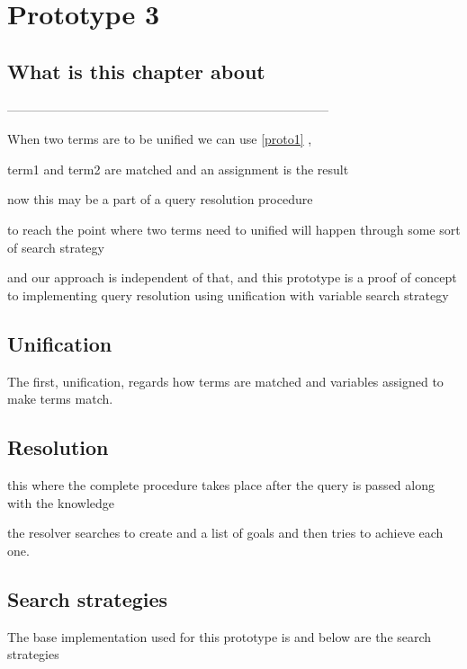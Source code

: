 \documentclass[thesis-solanki.tex]{files}
\begin{document}
\chapter{Prototype 3}{\label{proto3}}


\section{What is this chapter about}

-----------------------------------------------------------------------------

When two terms are to be unified we can use \ref{proto1} ,

term1 and term2 are matched and an assignment is the result 

now this may be a part of a query resolution procedure

to reach the point where two terms need to unified will happen through some sort of search strategy

and our approach is independent of that, and this prototype is a proof of concept to implementing query resolution using unification with
variable search strategy


\section{Unification}
The first, unification, regards how terms are matched and variables assigned to make terms match. \cite{website:prologunification}



\section{Resolution}
this where the complete procedure takes place after the query is passed along with the knowledge 

the resolver searches to create and a list of  goals and then tries to achieve each one.

\cite{website:prologresolution}

\cite{website:resolutionlogicwiki}




\section{Search strategies}
The base implementation used for this prototype  is \cite{website:mini-prolog-hugs98} and below are the search strategies 
\end{document}
